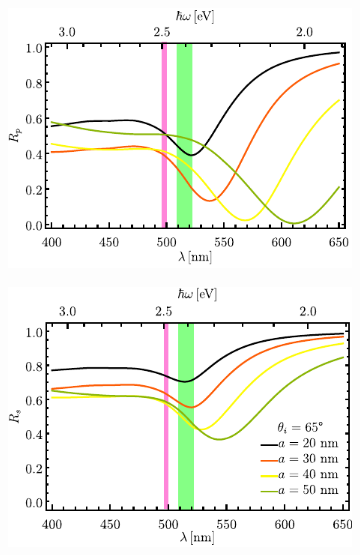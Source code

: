 \begin{figure}[h!]\centering\hspace*{-1.5em}
	\begin{subfigure}{.01\linewidth}\caption{}\label{sfig:R-RVar-cutp}\vspace{4.5cm}\end{subfigure}
	\begin{subfigure}{.45\linewidth}\hspace*{-1.5em}
	\includegraphics[scale=1]{2-Resultados/figs/8-AurVar/cut_angle_65_p.pdf}\end{subfigure}
	\begin{subfigure}{.01\linewidth}\caption{}\label{sfig:R-RVar-cuts}\vspace{4.5cm}\end{subfigure}\hspace*{-1.em}
	\begin{subfigure}{.45\linewidth}\centering
	\includegraphics[scale=1 ]{2-Resultados/figs/8-AurVar/cut_angle_65_s.pdf}\end{subfigure}\vspace*{-0em}\\

\end{figure}
